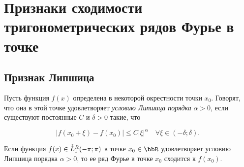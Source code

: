 \section{Признаки сходимости тригонометрических рядов Фурье в точке}
\subsection{Признак Липшица}

Пусть функция $f(x)$ определена в некоторой окрестности точки $x_0$. Говорят, что она в этой точке удовлетворяет \textit{условию Липшица порядка} $\alpha > 0$, если существуют постоянные $C$ и $\delta > 0$ такие, что 

\begin{equation} \label{ch17eq4}
|f(x_0 + \xi) - f(x_0)| \le C |\xi|^\alpha \quad \forall \xi \in (-\delta; \delta).
\end{equation}

\begin{thm}  \label{ch17thm3}
Если функция $f(x) \in \accentset{*}{L}^{R}_1(-\pi;\pi)$ в точке $x_0 \in \bbR$ удовлетворяет условию Липшица порядка $\alpha > 0$, то ее ряд Фурье в точке $x_0$ сходится к $f(x_0)$.
\end{thm}

